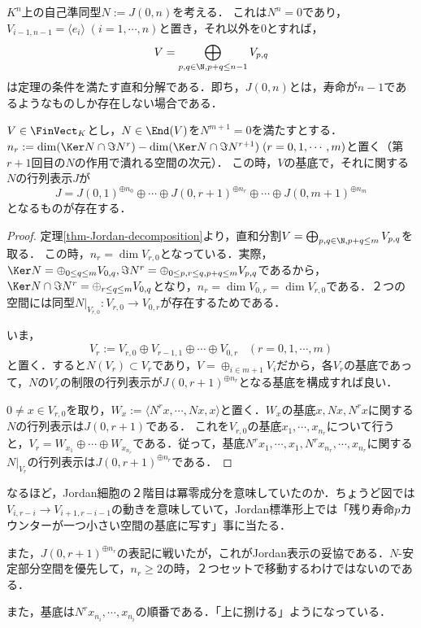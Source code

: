 \documentclass[uplatex, dvipdfmx]{jsreport}
\begin{document}
\begin{example}[$J(0,n)$の場合]
    $K^n$上の自己準同型$N:=J(0,n)$を考える．
    これは$N^n=0$であり，$V_{i-1,n-1}=\langle e_i\rangle\;(i=1,\cdots,n)$と置き，それ以外を$0$とすれば，
    \[V=\bigoplus_{p,q\in\N,p+q\le n-1}V_{p,q}\]
    は定理の条件を満たす直和分解である．即ち，$J(0,n)$とは，寿命が$n-1$であるようなものしか存在しない場合である．
\end{example}

\begin{corollary}[冪零準同型のJordan標準形]\label{cor-Jordan-form-of-nilpotents}
    $V\in\FinVect_K$とし，$N\in\End(V)$を$N^{m+1}=0$を満たすとする．
    $n_r:=\dim(\Ker N\cap\Im N^r)-\dim(\Ker N\cap\Im N^{r+1})\;(r=0,1,\cdots,m)$と置く（第$r+1$回目の$N$の作用で潰れる空間の次元）．
    この時，$V$の基底で，それに関する$N$の行列表示$J$が
    \[ J=J(0,1)^{\oplus n_0}\oplus\cdots\oplus J(0,r+1)^{\oplus n_r}\oplus\cdots\oplus J(0,m+1)^{\oplus n_m} \]
    となるものが存在する．
\end{corollary}
\begin{proof}
    定理\ref{thm-Jordan-decomposition}より，直和分割$V=\bigoplus_{p,q\in\N,p+q\le m}V_{p,q}$を取る．
    この時，$n_r=\dim V_{r,0}$となっている．実際，$\Ker N=\oplus_{0\le q\le m}V_{0,q}, \Im N^r=\oplus_{0\le p,r\le q,p+q\le m}V_{p,q}$であるから，
    $\Ker N\cap\Im N^r=\oplus_{r\le q\le m}V_{0,q}$となり，$n_r=\dim V_{0,r}=\dim V_{r,0}$である．２つの空間には同型$N|_{V_{r,0}}:V_{r,0}\to V_{0,r}$が存在するためである．

    いま，
    \[ V_r:=V_{r,0}\oplus V_{r-1,1}\oplus\cdots\oplus V_{0,r}\;\;\;(r=0,1,\cdots,m) \]
    と置く．すると$N(V_r)\subset V_r$であり，$V=\oplus_{i\in m+1}V_i$だから，各$V_r$の基底であって，$N$の$V_r$の制限の行列表示が$J(0,r+1)^{\oplus n_r}$となる基底を構成すれば良い．

    $0\ne x\in V_{r,0}$を取り，$W_x:=\langle N^rx,\cdots,Nx,x\rangle$と置く．$W_x$の基底$x,Nx,N^rx$に関する$N$の行列表示は$J(0,r+1)$である．
    これを$V_{r,0}$の基底$x_1,\cdots,x_{n_r}$について行うと，$V_r=W_{x_1}\oplus\cdots\oplus W_{x_{n_r}}$である．従って，基底$N^rx_1,\cdots,x_1,N^rx_{n_r},\cdots,x_{n_r}$に関する$N|_{V_r}$の行列表示は$J(0,r+1)^{\oplus n_r}$である．
\end{proof}
\begin{remark}
    なるほど，Jordan細胞の２階目は冪零成分を意味していたのか．ちょうど図では$V_{i,r-i}\to V_{i+1,r-i-1}$の動きを意味していて，Jordan標準形上では「残り寿命$p$カウンターが一つ小さい空間の基底に写す」事に当たる．

    また，$J(0,r+1)^{\oplus n_r}$の表記に戦いたが，これがJordan表示の妥協である．$N$-安定部分空間を優先して，$n_r\ge 2$の時，２つセットで移動するわけではないのである．

    また，基底は$N^rx_{n_i},\cdots,x_{n_i}$の順番である．「上に捌ける」ようになっている．
\end{remark}
\end{document}
